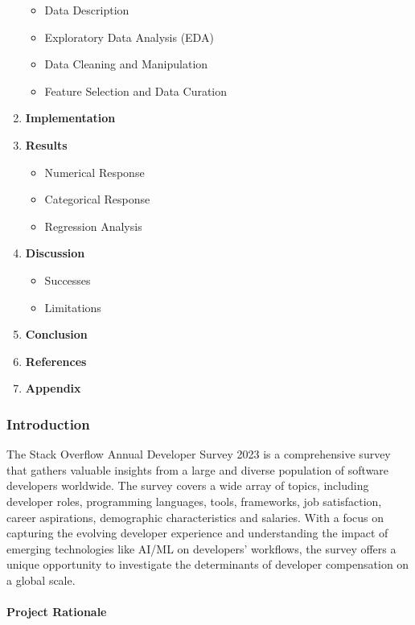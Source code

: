 \documentclass[
  12pt,
]{article}
\providecommand{\tightlist}{%
  \setlength{\itemsep}{0pt}\setlength{\parskip}{0pt}}
\begin{document}
\begin{enumerate}
  \begin{itemize}
  \tightlist
  \item
    Data Description
  \item
    Exploratory Data Analysis (EDA)
  \item
    Data Cleaning and Manipulation
  \item
    Feature Selection and Data Curation
  \end{itemize}
\item
  \textbf{Implementation}
\item
  \textbf{Results}

  \begin{itemize}
  \tightlist
  \item
    Numerical Response
  \item
    Categorical Response
  \item
    Regression Analysis
  \end{itemize}
\item
  \textbf{Discussion}

  \begin{itemize}
  \tightlist
  \item
    Successes
  \item
    Limitations
  \end{itemize}
\item
  \textbf{Conclusion}
\item
  \textbf{References}
\item
  \textbf{Appendix}
\end{enumerate}

\hypertarget{introduction}{%
\subsubsection{Introduction}\label{introduction}}

The Stack Overflow Annual Developer Survey 2023 is a comprehensive
survey that gathers valuable insights from a large and diverse
population of software developers worldwide. The survey covers a wide
array of topics, including developer roles, programming languages,
tools, frameworks, job satisfaction, career aspirations, demographic
characteristics and salaries. With a focus on capturing the evolving
developer experience and understanding the impact of emerging
technologies like AI/ML on developers' workflows, the survey offers a
unique opportunity to investigate the determinants of developer
compensation on a global scale.

\hypertarget{project-rationale}{%
\paragraph{Project Rationale}\label{project-rationale}}
\end{document}

